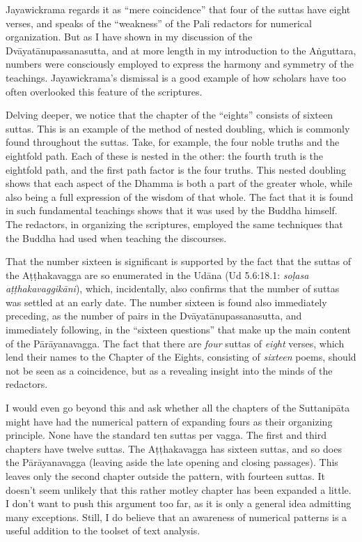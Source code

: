 \documentclass[12pt,openany]{book}%
\begin{document}
Jayawickrama regards it as “mere coincidence” that four of the suttas have eight verses, and speaks of the “weakness” of the Pali redactors for numerical organization. But as I have shown in my discussion of the \textsanskrit{Dvāyatānupassanasutta}, and at more length in my introduction to the \textsanskrit{Aṅguttara}, numbers were consciously employed to express the harmony and symmetry of the teachings. Jayawickrama’s dismissal is a good example of how scholars have too often overlooked this feature of the scriptures.

Delving deeper, we notice that the chapter of the “eights” consists of sixteen suttas. This is an example of the method of nested doubling, which is commonly found throughout the suttas. Take, for example, the four noble truths and the eightfold path. Each of these is nested in the other: the fourth truth is the eightfold path, and the first path factor is the four truths. This nested doubling shows that each aspect of the Dhamma is both a part of the greater whole, while also being a full expression of the wisdom of that whole. The fact that it is found in such fundamental teachings shows that it was used by the Buddha himself. The redactors, in organizing the scriptures, employed the same techniques that the Buddha had used when teaching the discourses.

That the number sixteen is significant is supported by the fact that the suttas of the \textsanskrit{Aṭṭhakavagga} are so enumerated in the \textsanskrit{Udāna} (Ud 5.6:18.1: \textit{\textsanskrit{soḷasa} \textsanskrit{aṭṭhakavaggikāni}}), which, incidentally, also confirms that the number of suttas was settled at an early date. The number sixteen is found also immediately preceding, as the number of pairs in the \textsanskrit{Dvāyatānupassanasutta}, and immediately following, in the “sixteen questions” that make up the main content of the \textsanskrit{Pārāyanavagga}. The fact that there are \emph{four} suttas of \emph{eight} verses, which lend their names to the Chapter of the Eights, consisting of \emph{sixteen} poems, should not be seen as a coincidence, but as a revealing insight into the minds of the redactors.

I would even go beyond this and ask whether all the chapters of the \textsanskrit{Suttanipāta} might have had the numerical pattern of expanding fours as their organizing principle. None have the standard ten suttas per vagga. The first and third chapters have twelve suttas. The \textsanskrit{Aṭṭhakavagga} has sixteen suttas, and so does the \textsanskrit{Pārāyanavagga} (leaving aside the late opening and closing passages). This leaves only the second chapter outside the pattern, with fourteen suttas. It doesn’t seem unlikely that this rather motley chapter has been expanded a little. I don’t want to push this argument too far, as it is only a general idea admitting many exceptions. Still, I do believe that an awareness of numerical patterns is a useful addition to the toolset of text analysis.
\end{document}
